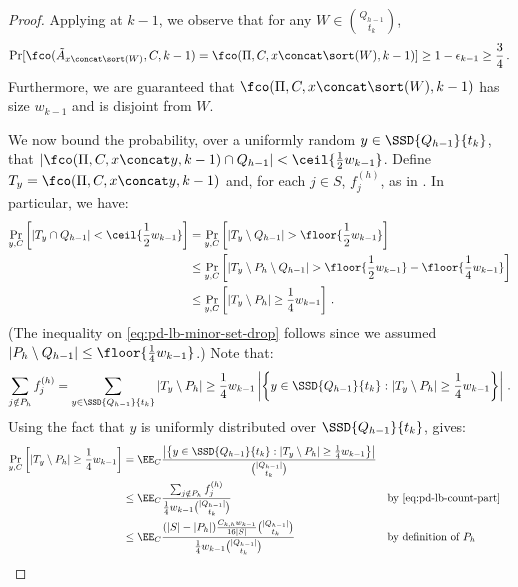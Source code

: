 \begin{itemize}
\begin{itemize}
\begin{proof}
  Applying  at $k-1$, we observe that for any $W \in \binom{Q_{h-1}}{t_k}$,
  \begin{align*}
    \Pr[\fco(\tilde{A}_{x \concat \sort(W)}, C, k-1) = \fco(\Pi, C, x \concat \sort(W), k-1)] 
    \ge 1 - \epsilon_{k-1} \ge \frac{3}{4} \,.
  \end{align*}
  Furthermore, we are guaranteed that $\fco(\Pi, C, x \concat \sort(W), k-1)$
  has size $w_{k-1}$ and is disjoint from $W$.
  
  We now bound the probability, over a uniformly random $y \in
  \SSD{Q_{h-1}}{t_k}$, that $|\fco(\Pi, C, x \concat y, k-1) \cap
  Q_{h-1}| < \ceil{\frac{1}{2} w_{k-1}}$. Define $T_y = \fco(\Pi, C, x \concat y, k-1)$ and, for each $j\in S$,
  $f_j^{(h)}$, as in . In particular, we have:
  \begin{align}
    \Pr_{y,C}\left[|T_y \cap Q_{h-1}| < \ceil{\frac{1}{2} w_{k-1}} \right]
      &= \Pr_{y,C}\left[|T_y \setminus Q_{h-1}| > \floor{\frac{1}{2} w_{k-1}} \right] \nonumber \\
      &\le \Pr_{y,C}\left[|T_y \setminus P_h \setminus Q_{h-1}| > \floor{\frac{1}{2} w_{k-1}} - \floor{\frac{1}{4} w_{k-1}} \right] \label{eq:pd-lb-minor-set-drop} \\
      &\le \Pr_{y,C}\left[|T_y \setminus P_h| \ge \frac{1}{4} w_{k-1} \right] \,. \nonumber
  \end{align}
  (The inequality on \cref{eq:pd-lb-minor-set-drop} follows since we
  assumed $|P_h \setminus Q_{h-1}| \le \floor{\frac{1}{4} w_{k-1}}$.) Note that:
  \begin{align}
    \sum_{j \notin P_h} f_j^{(h)} = \sum_{y \in \SSD{Q_{h-1}}{t_k}} |T_y \setminus P_h| \ge \frac{1}{4} w_{k-1} \left|\left\{y \in \SSD{Q_{h-1}}{t_k} : |T_y \setminus P_h| \ge \frac{1}{4} w_{k-1}\right\}\right| \label{eq:pd-lb-count-part} \,.
  \end{align}
  Using the fact that $y$ is uniformly distributed over $\SSD{Q_{h-1}}{t_k}$, gives:
  \begin{align*}
    \Pr_{y,C}\left[|T_y \setminus P_h| \ge \frac{1}{4} w_{k-1} \right]
      &= \EE_C \frac{\left|\left\{y \in \SSD{Q_{h-1}}{t_k} : |T_y \setminus P_h| \ge \frac{1}{4} w_{k-1}\right\}\right|}{\binom{|Q_{h-1}|}{t_k}} \\ 
      &\le \EE_C \frac{\sum_{j \notin P_h} f_j^{(h)}}{\frac{1}{4} w_{k-1} \binom{|Q_{h-1}|}{t_k}} && \text{by \cref{eq:pd-lb-count-part}}\\ 
      &\le \EE_C \frac{(|S|-|P_h|) \frac{C_{k,h} w_{k-1}}{16 |S|} \binom{|Q_{h-1}|}{t_k} }{\frac{1}{4} w_{k-1} \binom{|Q_{h-1}|}{t_k}} &&\text{by definition of $P_h$} \\

\end{align*}
\end{proof}
\end{itemize}
\end{itemize}
